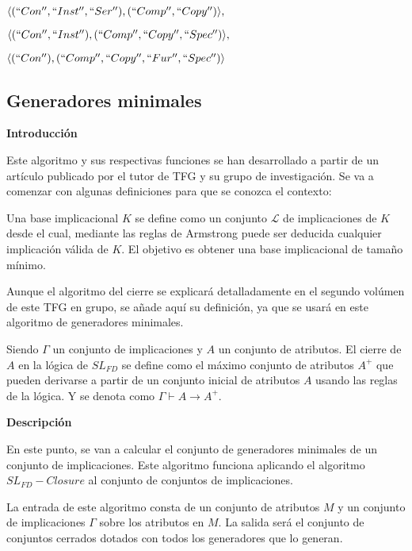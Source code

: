         \(\langle (``Con'', ``Inst'', ``Ser''), (``Comp'', ``Copy'') \rangle ,\)

        \(\langle (``Con'', ``Inst''), (``Comp'', ``Copy'', ``Spec'') \rangle ,\)

        \(\langle (``Con''), (``Comp'', ``Copy'', ``Fur'', ``Spec'') \rangle   \)
        \clearpage
        
\subsection{Generadores minimales}


    \textbf{Introducci\'on}

    Este algoritmo y sus respectivas funciones se han desarrollado a partir de un art\'iculo publicado por el tutor de 
    TFG y su grupo de investigaci\'on\cite{cla2012}.
    Se va a comenzar con algunas definiciones para que se conozca el contexto:

    Una base implicacional \(K\) se define como un conjunto \(\mathcal{L}\) de implicaciones de \(K\) desde el cual, mediante las reglas de 
    Armstrong puede ser deducida cualquier implicaci\'on v\'alida de \(K\). El objetivo es obtener una base implicacional de tama\~no 
    m\'inimo.

    Aunque el algoritmo del cierre se explicar\'a detalladamente en el segundo vol\'umen de este TFG en grupo, se a\~nade aqu\'i su 
    definici\'on, ya que se usar\'a en este algoritmo de generadores minimales.

    Siendo \(\Gamma\) un conjunto de implicaciones y \(A\) un conjunto de atributos. El cierre de \(A\) en la l\'ogica de \(SL_{FD}\) se define como 
    el m\'aximo conjunto de atributos \(A^+\) que pueden derivarse a partir de un conjunto inicial de atributos \(A\) usando las reglas de la 
    l\'ogica. Y se denota como \(\Gamma \vdash A \rightarrow A^+\).


    \bigskip
    \textbf{Descripci\'on}

    En este punto, se van a calcular el conjunto de generadores minimales de un conjunto de implicaciones. Este algoritmo funciona aplicando 
    el algoritmo \(SL_{FD}-Closure\) al conjunto de conjuntos de implicaciones.

    La entrada de este algoritmo consta de un conjunto de atributos \(M\) y un conjunto de implicaciones \(\Gamma\) sobre los atributos en \(M\).
    La salida ser\'a el conjunto de conjuntos cerrados dotados con todos los generadores que lo generan.

